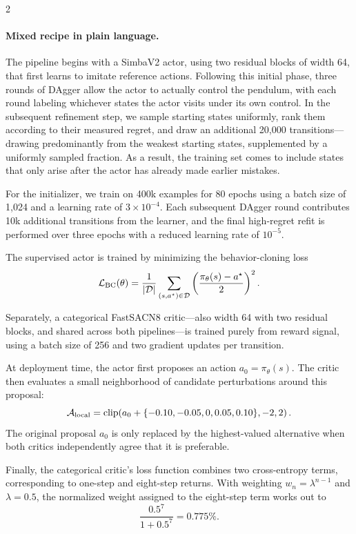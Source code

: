 \vspace{1mm}
\begin{multicols}{2}
\paragraph{Mixed recipe in plain language.}
The pipeline begins with a SimbaV2 actor, using two residual blocks of
width 64, that first learns to imitate reference actions. Following
this initial phase, three rounds of DAgger allow the actor to actually
control the pendulum, with each round labeling whichever states the
actor visits under its own control. In the subsequent refinement step,
we sample starting states uniformly, rank them according to their
measured regret, and draw an additional 20{,}000 transitions—drawing
predominantly from the weakest starting states, supplemented by a
uniformly sampled fraction. As a result, the training set comes to
include states that only arise after the actor has already made
earlier mistakes.

For the initializer, we train on 400k examples for 80 epochs using a
batch size of 1{,}024 and a learning rate of $3{\times}10^{-4}$. Each
subsequent DAgger round contributes 10k additional transitions from
the learner, and the final high-regret refit is performed over three
epochs with a reduced learning rate of $10^{-5}$.

The supervised actor is trained by minimizing the behavior-cloning loss
\[
\mathcal L_{\rm BC}(\theta)=
\frac{1}{|\mathcal D|}\sum_{(s,a^\star)\in\mathcal D}
\left(\frac{\pi_\theta(s)-a^\star}{2}\right)^2.
\]

Separately, a categorical FastSACN8 critic—also width 64 with two
residual blocks, and shared across both pipelines—is trained purely
from reward signal, using a batch size of 256 and two gradient updates
per transition.

At deployment time, the actor first proposes an action
$a_0=\pi_\theta(s)$. The critic then evaluates a small neighborhood of
candidate perturbations around this proposal:
\[
\mathcal A_{\rm local}=
\operatorname{clip}\!\left(a_0+\{-0.10,-0.05,0,0.05,0.10\},-2,2\right).
\]
The original proposal $a_0$ is only replaced by the highest-valued
alternative when both critics independently agree that it is
preferable.

Finally, the categorical critic's loss function combines two
cross-entropy terms, corresponding to one-step and eight-step returns.
With weighting $w_n=\lambda^{n-1}$ and $\lambda=0.5$, the normalized
weight assigned to the eight-step term works out to
\[
\frac{0.5^7}{1+0.5^7}=0.775\%.
\]


\end{multicols}
